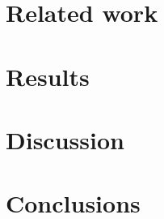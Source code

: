 \documentclass[a4paper,10pt]{article}
\begin{document}
\section{Related work}\label{chapter:related_work}


% 
\newpage
\section{Results}\label{chapter:results}


\newpage
\section{Discussion}\label{chapter:discussion}


\newpage
\section{Conclusions}\label{chapter:conclusions}


\clearemptydoublepage

%



\clearemptydoublepage

\appendix
{}



\end{document}
